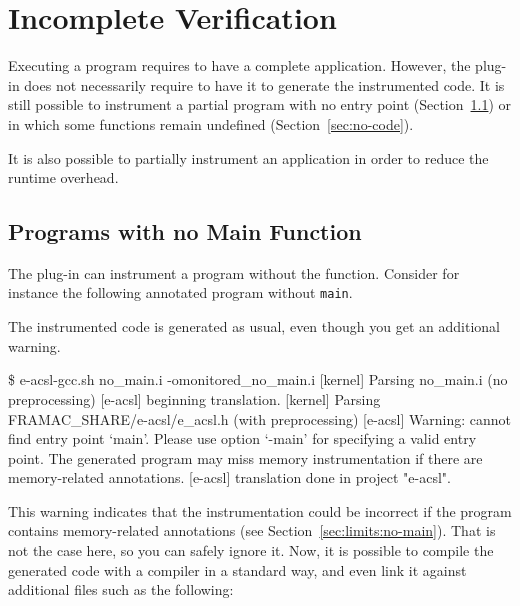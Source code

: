 \section{Incomplete Verification} %
\label{sec:incomplete}

Executing a \C program requires to have a complete application. However, the
\eacsl plug-in does not necessarily require to have it to generate the
instrumented code. It is still possible to instrument a partial program with no
entry point (Section~\ref{sec:no-main}) or in which some functions remain
undefined (Section~\ref{sec:no-code}).

It is also possible to partially instrument an application in order to reduce
the runtime overhead.


\subsection{Programs with no Main Function}
\label{sec:no-main}

The \eacsl plug-in can instrument a program without the  function.
Consider for instance the following annotated program without \texttt{main}.


The instrumented code is generated as usual, even though you get an additional
warning.
\begin{shell}
\$ e-acsl-gcc.sh no_main.i -omonitored_no_main.i
[kernel] Parsing no_main.i (no preprocessing)
[e-acsl] beginning translation.
[kernel] Parsing FRAMAC_SHARE/e-acsl/e_acsl.h (with preprocessing)
[e-acsl] Warning: cannot find entry point `main'.
  Please use option `-main' for specifying a valid entry point.
  The generated program may miss memory instrumentation
  if there are memory-related annotations.
[e-acsl] translation done in project "e-acsl".
\end{shell}

This warning indicates that the instrumentation could be incorrect if the
program contains memory-related annotations (see
Section~\ref{sec:limits:no-main}). That is not the case here, so you can
safely ignore it. Now, it is possible to compile the generated code with a \C
compiler in a standard way, and even link it against additional files such as
the following:

